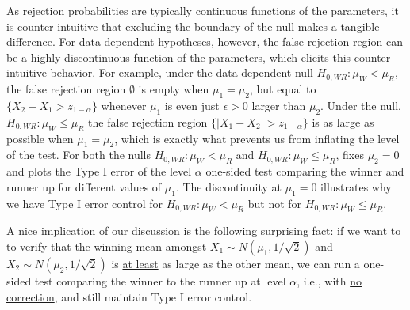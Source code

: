 \documentclass{article}
\begin{document}
As rejection probabilities are typically continuous functions of the parameters, it is counter-intuitive that excluding the boundary of the null makes a tangible difference. For data dependent hypotheses, however, the false rejection region can be a highly discontinuous function of the parameters, which elicits this counter-intuitive behavior. For example, under the data-dependent null $H_{0, WR} :\mu_W < \mu_R$, the false rejection region $\emptyset$ is empty when $\mu_1 = \mu_2$, but equal to $\{X_2 - X_1 > z_{1-\alpha}\}$ whenever $\mu_1$ is even just $\epsilon > 0$ larger than $\mu_2$. Under the null, $H_{0, WR} :\mu_W \leq \mu_R$ the false rejection region $\{|X_1 - X_2| > z_{1-\alpha}\}$ is as large as possible when $\mu_1 = \mu_2$, which is exactly what prevents us from inflating the level of the test. For both the nulls $H_{0, WR} :\mu_W < \mu_R$ and $H_{0, WR} :\mu_W \leq \mu_R$,  fixes $\mu_2=0$ and plots the Type I error of the level $\alpha$ one-sided test comparing the winner and runner up for different values of $\mu_1$. The discontinuity at $\mu_1=0$ illustrates why we have Type I error control for $H_{0, WR} :\mu_W < \mu_R$ but not for $H_{0, WR} :\mu_W \leq \mu_R$. 

A nice implication of our discussion is the following surprising fact: if we want to to verify that the winning mean amongst $X_1 \sim N(\mu_1, 1/\sqrt{2})$ and $X_2 \sim N(\mu_2, 1/\sqrt{2})$ is \underline{at least} as large as the other mean, we can run a one-sided test comparing the winner to the runner up at level $\alpha$, i.e., with \underline{no correction}, and still maintain Type I error control. 
\end{document}
